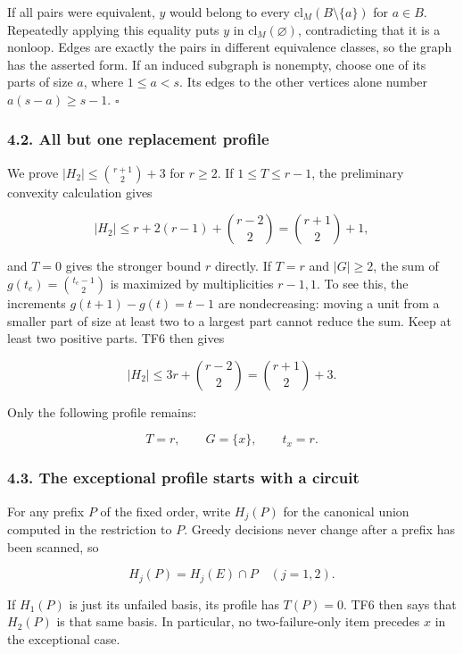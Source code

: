 If all pairs were equivalent, \(y\) would belong to every \(\mathrm{cl}_M(B\setminus\{a\})\) for \(a\in B\). Repeatedly applying this equality puts \(y\) in \(\mathrm{cl}_M(\varnothing)\), contradicting that it is a nonloop. Edges are exactly the pairs in different equivalence classes, so the graph has the asserted form. If an induced subgraph is nonempty, choose one of its parts of size \(a\), where \(1\le a<s\). Its edges to the other vertices alone number \(a(s-a)\ge s-1\). \(\square\)

\hypertarget{af-0a3ce40617-all-but-one-replacement-profile}{%
\subsubsection{4.2. All but one replacement profile}\label{af-0a3ce40617-all-but-one-replacement-profile}}

We prove \(|H_2|\le\binom{r+1}{2}+3\) for \(r\ge2\). If \(1\le T\le r-1\), the preliminary convexity calculation gives

\[
|H_2|\le r+2(r-1)+\binom{r-2}{2}
=\binom{r+1}{2}+1,
\]

and \(T=0\) gives the stronger bound \(r\) directly. If \(T=r\) and \(|G|\ge2\), the sum of \(g(t_e)=\binom{t_e-1}{2}\) is maximized by multiplicities \(r-1,1\). To see this, the increments \(g(t+1)-g(t)=t-1\) are nondecreasing: moving a unit from a smaller part of size at least two to a largest part cannot reduce the sum. Keep at least two positive parts. TF6 then gives

\[
|H_2|\le3r+\binom{r-2}{2}=\binom{r+1}{2}+3.
\]

Only the following profile remains:

\[
T=r,\qquad G=\{x\},\qquad t_x=r.
\tag{TF10}
\]

\hypertarget{af-0a3ce40617-the-exceptional-profile-starts-with-a-circuit}{%
\subsubsection{4.3. The exceptional profile starts with a circuit}\label{af-0a3ce40617-the-exceptional-profile-starts-with-a-circuit}}

For any prefix \(P\) of the fixed order, write \(H_j(P)\) for the canonical union computed in the restriction to \(P\). Greedy decisions never change after a prefix has been scanned, so

\[
H_j(P)=H_j(E)\cap P\quad(j=1,2).
\tag{TF11}
\]

If \(H_1(P)\) is just its unfailed basis, its profile has \(T(P)=0\). TF6 then says that \(H_2(P)\) is that same basis. In particular, no two-failure-only item precedes \(x\) in the exceptional case.

